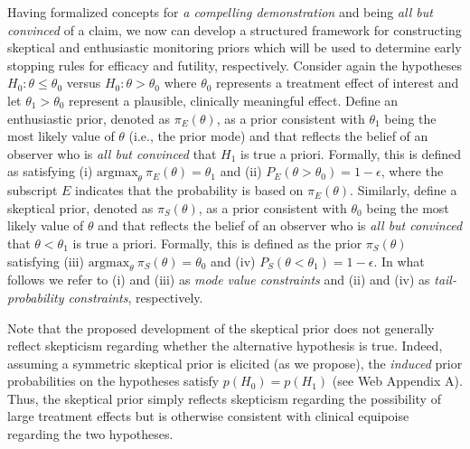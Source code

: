 \documentclass[AMA,STIX1COL,doublespace]{WileyNJD-v2}
\begin{document}
Having formalized concepts for \textit{a compelling demonstration} and  being \textit{all but convinced} of a claim, we now can develop a structured framework for constructing skeptical and enthusiastic monitoring priors which will be used to determine early stopping rules for efficacy and futility, respectively.
%
Consider again the hypotheses $H_0: \theta \le \theta_0$ versus $H_0: \theta > \theta_0$ where $\theta_0$ represents a 
treatment effect of interest and let $\theta_1>\theta_0$ represent a plausible, clinically meaningful effect.
%
Define an enthusiastic prior, denoted as $\pi_{E}(\theta)$, as a prior consistent with $\theta_1$ being the most 
likely value of $\theta$ (i.e., the prior mode) and that reflects the belief of an observer who is 
\textit{all but convinced} that $H_1$ is true a priori. 
%
Formally, this is defined as satisfying (i) $\text{argmax}_\theta~\pi_E(\theta)=\theta_1$
and (ii) $P_E(\theta >\theta_0)=1-\epsilon$, where the subscript $E$ indicates that the probability is 
based on $\pi_{E}(\theta)$.
%
Similarly, define a skeptical prior, denoted as $\pi_{S}(\theta)$, as a prior consistent with $\theta_0$ being the most 
likely value of $\theta$ and that reflects the belief of an observer who is \textit{all but convinced} that 
$\theta <\theta_1$ is true a priori. 
%
Formally, this is defined as the prior $\pi_{S}(\theta)$ satisfying
(iii) $\text{argmax}_\theta~\pi_S(\theta)=\theta_0$  and (iv) $P_S(\theta <\theta_1)=1-\epsilon$.
%
In what follows we refer to (i) and (iii) as \textit{mode value constraints} and (ii) and (iv) as \textit{tail-probability constraints}, respectively.

Note that the proposed development of the skeptical prior does not generally reflect skepticism regarding whether the alternative hypothesis is true. 
%
Indeed, assuming a symmetric skeptical prior is elicited (as we propose), the \textit{induced} prior probabilities on the hypotheses
satisfy $p(H_0) =  p(H_1)$ (see Web Appendix A).
%
%
%
Thus, the skeptical prior simply reflects skepticism regarding the possibility of large treatment effects but is
otherwise consistent with clinical equipoise regarding the two hypotheses.
%
\end{document}
